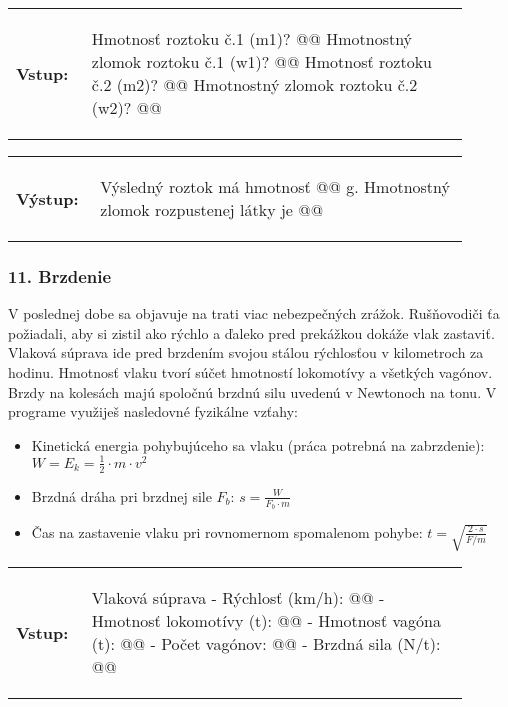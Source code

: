 \begin{tabular}{@{}p{0.15\linewidth}p{0.75\linewidth}}
\textbf{\small Vstup:} &
\vspace{-3em}
\begin{code}
Hmotnosť roztoku č.1 (m1)? @\fbox{\phantom{vstup}}@
Hmotnostný zlomok roztoku č.1 (w1)? @\fbox{\phantom{vstup}}@
Hmotnosť roztoku č.2 (m2)? @\fbox{\phantom{vstup}}@
Hmotnostný zlomok roztoku č.2 (w2)? @\fbox{\phantom{vstup}}@
\end{code}
\end{tabular}

\vspace{-2em}
\begin{tabular}{@{}p{0.15\linewidth}p{0.75\linewidth}}
\textbf{\small Výstup:} &
\vspace{-3em}
\begin{code}
Výsledný roztok má hmotnosť @\fbox{\phantom{vstup}}@ g.
Hmotnostný zlomok rozpustenej látky je @\fbox{\phantom{vstup}}@ %
\end{code}
\end{tabular}
\vspace{-2em}

\subsubsection*{11. Brzdenie}
V poslednej dobe sa objavuje na trati viac nebezpečných zrážok. Rušňovodiči ťa požiadali, aby si zistil ako rýchlo a ďaleko pred prekážkou dokáže vlak zastaviť. Vlaková súprava ide pred brzdením svojou stálou rýchlosťou v kilometroch za hodinu. Hmotnosť vlaku tvorí súčet hmotností lokomotívy a všetkých vagónov. Brzdy na kolesách majú spoločnú brzdnú silu uvedenú v Newtonoch na tonu. V programe využiješ nasledovné fyzikálne vzťahy:

\begin{itemize}
\itemsep0pt
\item Kinetická energia pohybujúceho sa vlaku (práca potrebná na zabrzdenie): \\ $ W = E_k = \frac{1}{2} \cdot m \cdot v^2 $
\item Brzdná dráha pri brzdnej sile $F_b$: $s = \frac{W}{F_b \cdot m} $
\item Čas na zastavenie vlaku pri rovnomernom spomalenom pohybe: $ t = \sqrt{\frac{2 \cdot s}{F / m}} $
\end{itemize}

\begin{tabular}{@{}p{0.15\linewidth}p{0.75\linewidth}}
\textbf{\small Vstup:} &
\vspace{-3em}
\begin{code}
Vlaková súprava
- Rýchlosť (km/h): @\fbox{\phantom{vstup}}@
- Hmotnosť lokomotívy (t): @\fbox{\phantom{vstup}}@
- Hmotnosť vagóna (t): @\fbox{\phantom{vstup}}@
- Počet vagónov: @\fbox{\phantom{vstup}}@
- Brzdná sila (N/t): @\fbox{\phantom{vstup}}@
\end{code}
\end{tabular}

